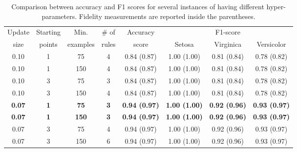 
\begin{table}
	\caption{Comparison between accuracy and F1 scores for several instances of \iter{} having different hyper-parameters. Fidelity measurements are reported inside the parentheses.}
	\label{tab:iter}
	\begin{tabular}{c|c|c|c|c|ccc}
		\toprule
		Update & Starting & Min. & \# of & Accuracy & \multicolumn{3}{c}{F1-score}\\
 		size & points & examples & rules & score & Setosa & Virginica & Versicolor \\
		\midrule
		0.10 & 1 & 75 & 4 & 0.84 (0.87) & 1.00 (1.00) & 0.81 (0.84) & 0.78 (0.82) \\
		0.10 & 1 & 150 & 4 & 0.84 (0.87) & 1.00 (1.00) & 0.81 (0.84) & 0.78 (0.82) \\
		0.10 & 3 & 75 & 3 & 0.84 (0.87) & 1.00 (1.00) & 0.81 (0.84) & 0.78 (0.82) \\
		0.10 & 3 & 150 & 4 & 0.84 (0.87) & 1.00 (1.00) & 0.81 (0.84) & 0.78 (0.82) \\
		\textbf{0.07} & \textbf{1} & \textbf{75} & \textbf{3} & \textbf{0.94 (0.97)} & \textbf{1.00 (1.00)} & \textbf{0.92 (0.96)} & \textbf{0.93 (0.97)} \\
		\textbf{0.07} & \textbf{1} & \textbf{150} & \textbf{3} & \textbf{0.94 (0.97)} & \textbf{1.00 (1.00)} & \textbf{0.92 (0.96)} & \textbf{0.93 (0.97)} \\
		0.07 & 3 & 75 & 4 & 0.94 (0.97) & 1.00 (1.00) & 0.92 (0.96) & 0.93 (0.97) \\
		0.07 & 3 & 150 & 6 & 0.94 (0.97) & 1.00 (1.00) & 0.92 (0.96) & 0.93 (0.97) \\
		\bottomrule
	\end{tabular}
\end{table}
